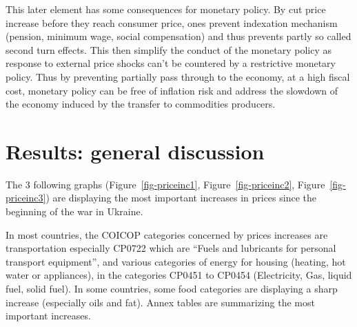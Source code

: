 \documentclass[
  9pt,
  a4paper,
  numbers=noendperiod,
  DIV=12]{scrartcl}
\begin{document}
This later element has some consequences for monetary policy. By cut
price increase before they reach consumer price, ones prevent indexation
mechanism (pension, minimum wage, social compensation) and thus prevents
partly so called second turn effects. This then simplify the conduct of
the monetary policy as response to external price shocks can't be
countered by a restrictive monetary policy. Thus by preventing partially
pass through to the economy, at a high fiscal cost, monetary policy can
be free of inflation risk and address the slowdown of the economy
induced by the transfer to commodities producers.

\hypertarget{results-general-discussion}{%
\section{Results: general discussion}\label{results-general-discussion}}

The 3 following graphs
(Figure~\ref{fig-priceinc1}, Figure~\ref{fig-priceinc2}, Figure~\ref{fig-priceinc3})
are displaying the most important increases in prices since the
beginning of the war in Ukraine.

In most countries, the COICOP categories concerned by prices increases
are transportation especially CP0722 which are ``Fuels and lubricants
for personal transport equipment'', and various categories of energy for
housing (heating, hot water or appliances), in the categories CP0451 to
CP0454 (Electricity, Gas, liquid fuel, solid fuel). In some countries,
some food categories are displaying a sharp increase (especially oils
and fat). Annex tables are summarizing the most important increases.
\end{document}
